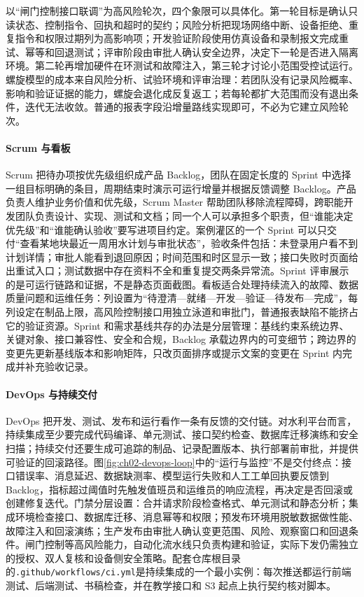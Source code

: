 以“闸门控制接口联调”为高风险轮次，四个象限可以具体化。第一轮目标是确认只读状态、控制指令、回执和超时的契约；风险分析把现场网络中断、设备拒绝、重复指令和权限过期列为高影响项；开发验证阶段使用仿真设备和录制报文完成重试、幂等和回退测试；评审阶段由审批人确认安全边界，决定下一轮是否进入隔离环境。第二轮再增加硬件在环测试和故障注入，第三轮才讨论小范围受控试运行。螺旋模型的成本来自风险分析、试验环境和评审治理：若团队没有记录风险概率、影响和验证证据的能力，螺旋会退化成反复返工；若每轮都扩大范围而没有退出条件，迭代无法收敛。普通的报表字段沿增量路线实现即可，不必为它建立风险轮次。

\paragraph{Scrum 与看板}Scrum 把待办项按优先级组织成产品 Backlog，团队在固定长度的 Sprint 中选择一组目标明确的条目，周期结束时演示可运行增量并根据反馈调整 Backlog。产品负责人维护业务价值和优先级，Scrum Master 帮助团队移除流程障碍，跨职能开发团队负责设计、实现、测试和文档；同一个人可以承担多个职责，但“谁能决定优先级”和“谁能确认验收”要写进项目约定。案例灌区的一个 Sprint 可以只交付“查看某地块最近一周用水计划与审批状态”，验收条件包括：未登录用户看不到计划详情；审批人能看到退回原因；时间范围和时区显示一致；接口失败时页面给出重试入口；测试数据中存在资料不全和重复提交两条异常流。Sprint 评审展示的是可运行链路和证据，不是静态页面截图。看板适合处理持续流入的故障、数据质量问题和运维任务：列设置为“待澄清—就绪—开发—验证—待发布—完成”，每列设定在制品上限，高风险控制接口用独立泳道和审批门，普通报表缺陷不能挤占它的验证资源。Sprint 和需求基线共存的办法是分层管理：基线约束系统边界、关键对象、接口兼容性、安全和合规，Backlog 承载边界内的可变细节；跨边界的变更先更新基线版本和影响矩阵，只改页面排序或提示文案的变更在 Sprint 内完成并补充验收记录。

\paragraph{DevOps 与持续交付}DevOps 把开发、测试、发布和运行看作一条有反馈的交付链。对水利平台而言，持续集成至少要完成代码编译、单元测试、接口契约检查、数据库迁移演练和安全扫描；持续交付还要生成可追踪的制品、记录配置版本、执行部署前审批，并提供可验证的回滚路径。图\ref{fig:ch02-devops-loop}中的“运行与监控”不是交付终点：接口错误率、消息延迟、数据缺测率、模型运行失败和人工工单回执要反馈到 Backlog，指标超过阈值时先触发值班员和运维员的响应流程，再决定是否回滚或创建修复迭代。门禁分层设置：合并请求阶段检查格式、单元测试和静态分析；集成环境检查接口、数据库迁移、消息幂等和权限；预发布环境用脱敏数据做性能、故障注入和回滚演练；生产发布由审批人确认变更范围、风险、观察窗口和回退条件。闸门控制等高风险能力，自动化流水线只负责构建和验证，实际下发仍需独立的授权、双人复核和设备侧安全策略。配套仓库根目录的\texttt{.github/workflows/ci.yml}是持续集成的一个最小实例：每次推送都运行前端测试、后端测试、书稿检查，并在教学接口和 S3 起点上执行契约核对脚本。

